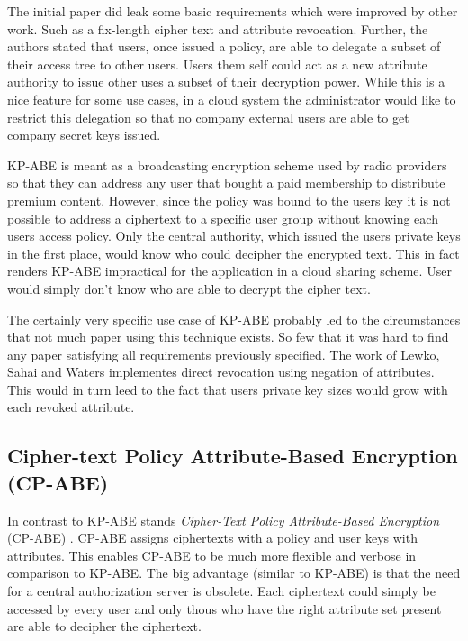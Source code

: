 The initial paper \cite{goyal2006attribute} did leak some basic requirements which were improved by other work. Such as a fix-length cipher text and attribute revocation. Further, the authors stated that users, once issued a policy, are able to delegate a subset of their access tree to other users. Users them self could act as a new attribute authority to issue other uses a subset of their decryption power. While this is a nice feature for some use cases, in a cloud system the administrator would like to restrict this delegation so that no company external users are able to get company secret keys issued. 

KP-ABE is meant as a broadcasting encryption scheme used by radio providers so that they can address any user that bought a paid membership to distribute premium content. However, since the policy was bound to the users key it is not possible to address a ciphertext to a specific user group without knowing each users access policy. Only the central authority, which issued the users private keys in the first place, would know who could decipher the encrypted text. This in fact renders \ac{KP-ABE} impractical for the application in a cloud sharing scheme. User would simply don't know who are able to decrypt the cipher text. 

The certainly very specific use case of \ac{KP-ABE} probably led to the circumstances that not much paper using this technique exists. So few that it was hard to find any paper satisfying all requirements previously specified. The work of Lewko, Sahai and Waters \cite{lewko2010revocation} implementes direct revocation using negation of attributes. This would in turn leed to the fact that users private key sizes would grow with each revoked attribute. 

\subsection{Cipher-text Policy Attribute-Based Encryption (\ac{CP-ABE})}
In contrast to KP-ABE stands \textit{Cipher-Text Policy Attribute-Based Encryption} (\ac{CP-ABE}) \cite{bethencourt2007ciphertext}. \ac{CP-ABE} assigns ciphertexts with a policy and user keys with attributes. This enables \ac{CP-ABE} to be much more flexible and verbose in comparison to \ac{KP-ABE}. The big advantage (similar to \ac{KP-ABE}) is that the need for a central authorization server is obsolete. Each ciphertext could simply be accessed by every user and only thous who have the right attribute set present are able to decipher the ciphertext. 

